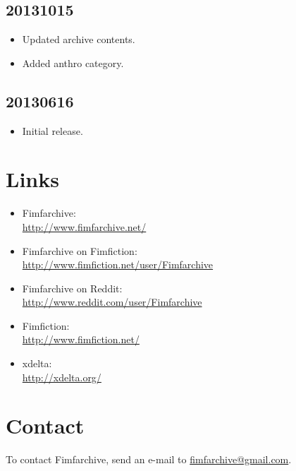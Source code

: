 \documentclass[hidelinks,a4paper,12pt]{article}
\begin{document}
\subsection{20131015} \label{sec:changelog_20131015}

\begin{itemize}
\item Updated archive contents.
\item Added anthro category.
\end{itemize}

\subsection{20130616} \label{sec:changelog_20130616}

\begin{itemize}
\item Initial release.
\end{itemize}


\section{Links} \label{sec:links}

\begin{itemize}
\item Fimfarchive: \\ \url{http://www.fimfarchive.net/}
\item Fimfarchive on Fimfiction: \\ \url{http://www.fimfiction.net/user/Fimfarchive}
\item Fimfarchive on Reddit: \\ \url{http://www.reddit.com/user/Fimfarchive}
\item Fimfiction: \\ \url{http://www.fimfiction.net/}
\item xdelta: \\ \url{http://xdelta.org/}
\end{itemize}


\section{Contact} \label{sec:contact}

To contact Fimfarchive, send an e-mail to \href{mailto:fimfarchive@gmail.com}{fimfarchive@gmail.com}.
\end{document}
